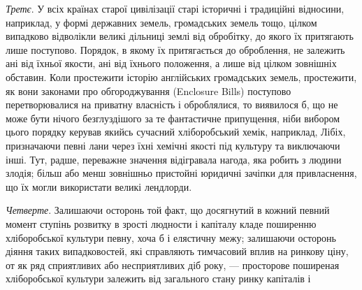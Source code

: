\emph{Третє}. У всіх країнах старої цивілізації старі історичні і традиційні
відносини, наприклад, у формі державних земель, громадських земель тощо,
цілком випадково відволікли великі дільниці землі від обробітку, до якого їх
притягають лише поступово. Порядок, в якому їх притягається до оброблення,
не залежить ані від їхньої якости, ані від їхнього положення, а лише від цілком
зовнішніх обставин. Коли простежити історію англійських громадських земель,
простежити, як вони законами про обгороджування (Enclosure Bills) поступово перетворювалися
на приватну власність і оброблялися, то виявилося б, що не може
бути нічого безглуздішого за те фантастичне припущення, ніби вибором цього
порядку керував якийсь сучасний хліборобський хемік, наприклад, Лібіх, призначаючи
певні лани через їхні хемічні якості під культуру та виключаючи
інші. Тут, радше, переважне значення відігравала нагода, яка робить з людини
злодія; більш або менш зовнішньо пристойні юридичні зачіпки для привласнення,
що їх могли використати великі лендлорди.

\emph{Четверте}. Залишаючи осторонь той факт, що досягнутий в кожний
певний момент ступінь розвитку в зрості людности і капіталу кладе поширенню
хліборобської культури певну, хоча б і елястичну межу; залишаючи осторонь
діяння таких випадковостей, які справляють тимчасовий вплив на ринкову
ціну, от як ряд сприятливих або несприятливих діб року, — просторове поширеная
хліборобської культури залежить від загального стану ринку капіталів і
\parbreak{}  %

